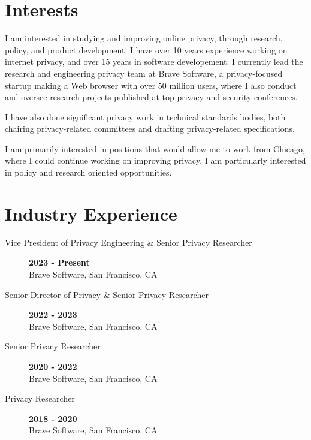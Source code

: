 \documentclass[wideaddress]{vitae}
\author{Peter E. Snyder}
\begin{document}
  \maketitle

  \section{Interests}
  \begin{description}
    \item{\noindent I am interested in studying and improving online privacy, through research,
    policy, and product development. I have over 10 years experience working on
    internet privacy, and over 15 years in software developement. I currently
    lead the research and engineering privacy team at Brave Software,
    a privacy-focused startup making a Web browser with over 50 million users, where I also
    conduct and oversee research projects published at top privacy and security conferences.}

    \item{\noindent I have also done significant privacy work in technical
    standards bodies, both chairing privacy-related committees and drafting
    privacy-related specifications.}

    \item{\noindent I am primarily interested in positions that would allow me to work from Chicago,
    where I could continue working on improving privacy. I am particularly interested
    in policy and research oriented opportunities.}
  \end{description}

  \section{Industry Experience}
  \begin{description}
    \item[Vice President of Privacy Engineering \& Senior Privacy Researcher] \hfill \textbf{2023 - Present}\\
    Brave Software, San Francisco, CA

    \item[Senior Director of Privacy \& Senior Privacy Researcher] \hfill \textbf{2022 - 2023}\\
    Brave Software, San Francisco, CA

    \item[Senior Privacy Researcher] \hfill \textbf{2020 - 2022}\\
    Brave Software, San Francisco, CA

    \item[Privacy Researcher] \hfill \textbf{2018 - 2020}\\
    Brave Software, San Francisco, CA
  \end{description}
\end{document}
